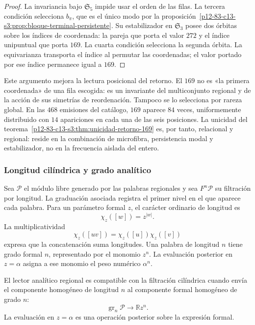 \begin{proof}
La invariancia bajo \(\mathfrak S_5\) impide usar el orden de las filas. La
tercera condición selecciona \(b_\pi\), que es el único modo por la
proposición~\ref{p12-83-c13-s3:prop:bloque-terminal-persistente}. Su estabilizador en
\(\mathfrak S_3\) posee dos órbitas sobre los índices de coordenada:
la pareja que porta el valor \(272\) y el índice unipuntual que porta
\(169\). La cuarta condición selecciona la segunda órbita. La
equivarianza transporta el índice al permutar las coordenadas; el
valor portado por ese índice permanece igual a \(169\).
\end{proof}

Este argumento mejora la lectura posicional del retorno. El \(169\) no es
«la primera coordenada» de una fila escogida: es un invariante del
multiconjunto regional y de la acción de sus simetrías de reordenación.
Tampoco se lo selecciona por rareza global. En las \(468\) emisiones del
catálogo, \(169\) aparece \(84\) veces, uniformemente distribuido con
\(14\) apariciones en cada una de las seis posiciones. La unicidad del
teorema~\ref{p12-83-c13-s3:thm:unicidad-retorno-169} es, por tanto, relacional y regional: reside
en la combinación de microfibra, persistencia modal y estabilizador, no en la
frecuencia aislada del entero.

\subsubsection{Longitud cilíndrica y grado analítico}

Sea \(\mathcal P\) el módulo libre generado por las palabras regionales y
sea \(F^n\mathcal P\) su filtración por longitud. La graduación asociada
registra el primer nivel en el que aparece cada palabra. Para un parámetro
formal \(z\), el carácter ordinario de longitud es
\[
\chi_z([w])=z^{|w|}.
\]
La multiplicatividad
\[
\chi_z([uv])=\chi_z([u])\chi_z([v])
\]
expresa que la concatenación suma longitudes. Una palabra de longitud
\(n\) tiene grado formal \(n\), representado por el monomio \(z^n\).
La evaluación posterior en \(z=\alpha\) asigna a ese monomio el peso
numérico \(\alpha^n\).

\begin{definition}
\label{p12-83-c13-s3:def:compatibilidad-grado}
El lector analítico regional es compatible con la filtración cilíndrica
cuando envía el componente homogéneo de longitud \(n\) al componente
formal homogéneo de grado \(n\):
\[
\operatorname{gr}_n\mathcal P\longrightarrow
\mathbb R z^n.
\]
La evaluación en \(z=\alpha\) es una operación posterior sobre la
expresión formal.
\end{definition}

